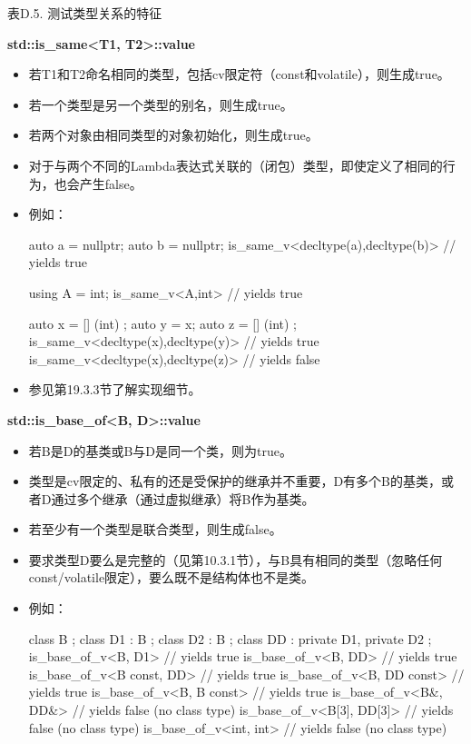 \begin{center}
表D.5. 测试类型关系的特征
\end{center}

\textbf{std::is\_same<T1, T2>::value}

\begin{itemize}
\item
若T1和T2命名相同的类型，包括cv限定符（const和volatile），则生成true。

\item
若一个类型是另一个类型的别名，则生成true。

\item
若两个对象由相同类型的对象初始化，则生成true。

\item
对于与两个不同的Lambda表达式关联的（闭包）类型，即使定义了相同的行为，也会产生false。

\item
例如：
\begin{cpp}
auto a = nullptr;
auto b = nullptr;
is_same_v<decltype(a),decltype(b)> // yields true

using A = int;
is_same_v<A,int> // yields true

auto x = [] (int) {};
auto y = x;
auto z = [] (int) {};
is_same_v<decltype(x),decltype(y)> // yields true
is_same_v<decltype(x),decltype(z)> // yields false
\end{cpp}

\item
参见第19.3.3节了解实现细节。
\end{itemize}

\textbf{std::is\_base\_of<B, D>::value}

\begin{itemize}
\item
若B是D的基类或B与D是同一个类，则为true。

\item
类型是cv限定的、私有的还是受保护的继承并不重要，D有多个B的基类，或者D通过多个继承（通过虚拟继承）将B作为基类。

\item
若至少有一个类型是联合类型，则生成false。

\item
要求类型D要么是完整的（见第10.3.1节），与B具有相同的类型（忽略任何const/volatile限定），要么既不是结构体也不是类。

\item
例如：
\begin{cpp}
class B {};
class D1 : B {};
class D2 : B {};
class DD : private D1, private D2 {};
is_base_of_v<B, D1> // yields true
is_base_of_v<B, DD> // yields true
is_base_of_v<B const, DD> // yields true
is_base_of_v<B, DD const> // yields true
is_base_of_v<B, B const> // yields true
is_base_of_v<B&, DD&> // yields false (no class type)
is_base_of_v<B[3], DD[3]> // yields false (no class type)
is_base_of_v<int, int> // yields false (no class type)
\end{cpp}
\end{itemize}

